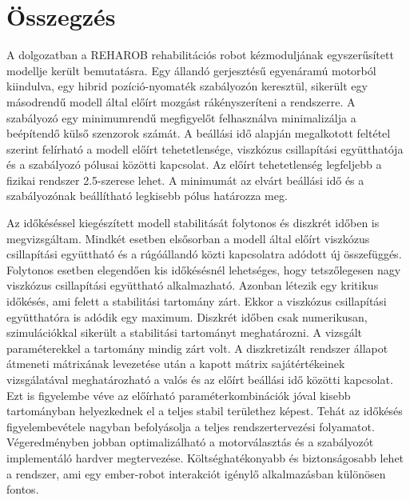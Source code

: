 \chapter{Összegzés}\label{chap:summary}

A dolgozatban a REHAROB rehabilitációs robot kézmoduljának egyszerűsített modellje került bemutatásra. Egy állandó 
gerjesztésű egyenáramú motorból kiindulva, egy hibrid pozíció-nyomaték szabályozón keresztül, sikerült egy másodrendű 
modell által előírt mozgást rákényszeríteni a rendszerre. A szabályozó egy minimumrendű megfigyelőt 
felhasználva minimalizálja a beépítendő külső szenzorok számát. A beállási idő alapján megalkotott feltétel 
szerint felírható a modell előírt tehetetlensége, viszkózus csillapítási együtthatója és a szabályozó 
pólusai közötti kapcsolat. Az előírt tehetetlenség legfeljebb a fizikai rendszer 2.5-szerese lehet. A minimumát az 
elvárt beállási idő és a szabályozónak beállítható legkisebb pólus határozza meg. 

Az időkéséssel kiegészített modell stabilitását folytonos és diszkrét időben is megvizsgáltam. Mindkét 
esetben elsősorban a modell által előírt viszkózus csillapítási együttható és a rúgóállandó közti 
kapcsolatra adódott új összefüggés. Folytonos esetben elegendően kis időkésésnél lehetséges, hogy tetszőlegesen 
nagy viszkózus csillapítási együttható alkalmazható. Azonban létezik egy kritikus időkésés, ami felett 
a stabilitási tartomány zárt. Ekkor a viszkózus csillapítási együtthatóra is adódik egy maximum. Diszkrét időben csak numerikusan, szimulációkkal sikerült a stabilitási tartományt
meghatározni. A vizsgált paraméterekkel a tartomány mindig zárt volt. A diszkretizált rendszer állapot átmeneti mátrixának 
levezetése után a kapott mátrix sajátértékeinek
vizsgálatával meghatározható a valós és az előírt beállási idő közötti kapcsolat. Ezt is figyelembe véve az 
előírható paraméterkombinációk jóval kisebb tartományban helyezkednek el a teljes stabil területhez képest. Tehát 
az időkésés figyelembevétele nagyban befolyásolja a teljes rendszertervezési folyamatot. Végeredményben jobban 
optimalizálható a motorválasztás és a szabályozót implementáló hardver megtervezése. Költséghatékonyabb és biztonságosabb 
lehet a rendszer, ami egy ember-robot interakciót igénylő alkalmazásban különösen fontos. 

